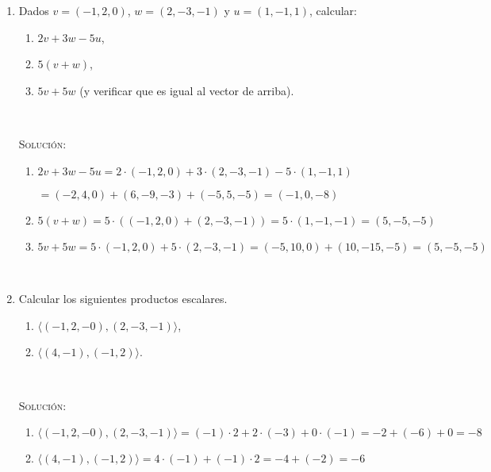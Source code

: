 \documentclass[a4paper,12pt,twoside,spanish,reqno]{amsbook}
\numberwithin{equation}{section}
\newcommand{\rta}{\noindent\textsc{Solución: }}
\begin{document}
\begin{enumerate}

\item Dados $v = (-1, 2, 0)$, $w = (2,-3,-1)$ y $u = (1,-1,1)$, calcular:
\begin{enumerate}
	\item $2v + 3w -5u$,
	\item $5(v+w)$, 
	\item $5v + 5w$ (y verificar que es igual al vector de arriba).
\end{enumerate}

\

\rta

\begin{enumerate}
	\item $2v + 3w -5u = 2 \cdot (-1, 2, 0) + 3 \cdot (2,-3,-1) - 5 \cdot (1,-1,1) $

$ = (-2, 4, 0) + (6,-9,-3) + (-5,5,-5) = \boxed{(-1,0,-8)}$
	\item $5(v+w) = 5 \cdot ( (-1, 2, 0) + (2,-3,-1) ) = 5 \cdot (1,-1,-1) = \boxed{(5,-5,-5)} $
	\item $5v + 5w = 5 \cdot (-1, 2, 0) + 5 \cdot (2,-3,-1) = (-5, 10, 0) + (10,-15,-5) = \boxed{(5,-5,-5)}$
\end{enumerate}


\

\item Calcular los siguientes productos escalares. %
\begin{enumerate}
  \item $\langle (-1, 2, -0) ,(2,-3,-1) \rangle$, 
  \item  $\langle (4,-1),(-1,2) \rangle$.
\end{enumerate}

\

\rta

\begin{enumerate}
  \item $\langle (-1, 2, -0) ,(2,-3,-1) \rangle = (-1) \cdot 2 + 2 \cdot (-3) + 0 \cdot (-1) = -2 + (-6) + 0 = \boxed{-8}$ 
  \item  $\langle (4,-1),(-1,2) \rangle = 4 \cdot (-1) + (-1) \cdot 2 = -4 + (-2) = \boxed{-6}$
\end{enumerate}


\end{enumerate}
\end{document}

